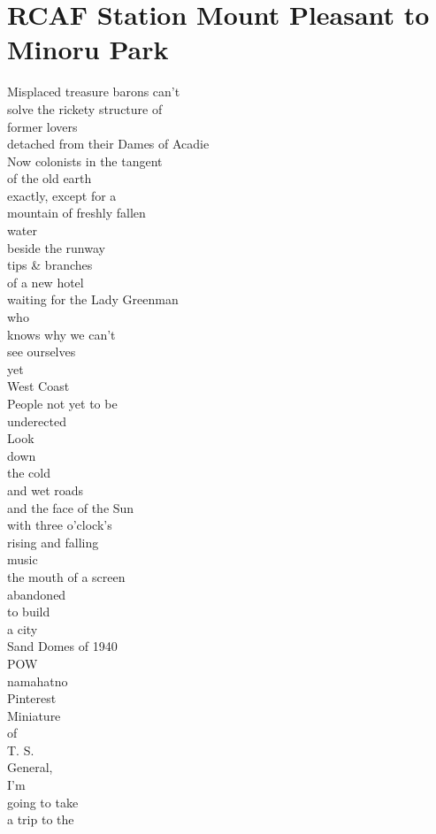 \documentclass[smalldemyvopaper,11pt,twoside,onecolumn,openright,extrafontsizes]{memoir}
\begin{document}
\chapter{RCAF Station Mount Pleasant to Minoru Park}
Misplaced treasure barons can't
\\solve the rickety structure of
\\former lovers
\\detached from their Dames of Acadie
\\Now colonists in the tangent
\\of the old earth
\\exactly, except for a
\\mountain of freshly fallen
\\water
\\beside the runway
\\tips \& branches
\\of a new hotel
\\waiting for the Lady Greenman
\\who
\\knows why we can't
\\see ourselves
\\yet
\\West Coast
\\People not yet to be
\\underected
\\Look
\\down
\\the cold
\\and wet roads
\\and the face of the Sun
\\with three o'clock's
\\rising and falling
\\music
\\the mouth of a screen
\\abandoned
\\to build
\\a city
\\Sand Domes of 1940
\\POW
\\namahatno
\\Pinterest
\\Miniature
\\of
\\T. S.
\\General,
\\I'm
\\going to take
\\a trip to the
\end{document}
